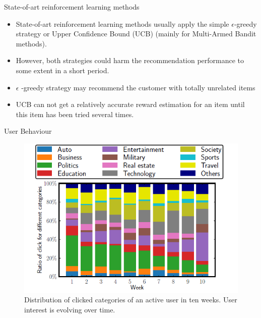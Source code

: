 \begin{frame}{State-of-art reinforcement learning methods}
   \begin{itemize}
       \item State-of-art reinforcement learning methods usually apply the simple $\epsilon$-greedy strategy or Upper Confidence Bound (UCB) (mainly for Multi-Armed Bandit methods). 
       \item However, both strategies could harm the recommendation performance to some extent in a short period. 
       \item $\epsilon$ -greedy strategy may recommend the customer with totally unrelated items
       \item UCB can not get a relatively accurate reward estimation for an item until this item has been tried several times.
\end{itemize}
\end{frame}


\begin{frame}{User Behaviour}
        \begin{figure}
            \centering
            \includegraphics[scale = 0.6]{PPT/figure 1.png}
            \caption{Distribution of clicked categories of an active user
in ten weeks. User interest is evolving over time.}
        \end{figure}
\end{frame}


